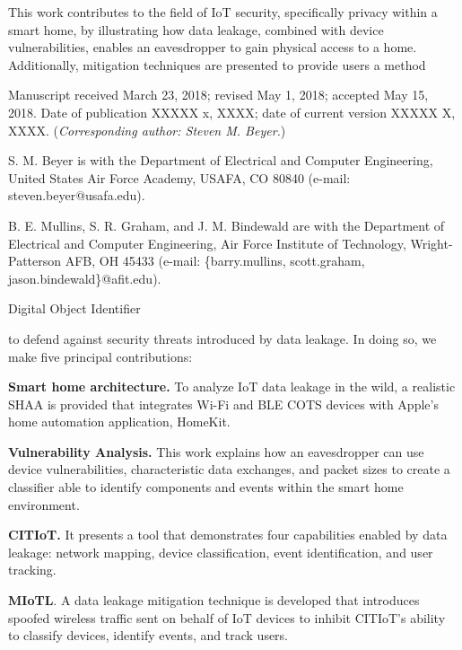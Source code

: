 \documentclass[journal]{./IEEEtran/IEEEtran}
\begin{document}
This work contributes to the field of \ac{IoT} security, specifically privacy within a smart home, by illustrating how data leakage, combined with device vulnerabilities, enables an eavesdropper to gain physical access to a home. Additionally, mitigation techniques are presented to provide users a method 

\vspace*{-3\baselineskip}

\begin{IEEEbiographynophoto}{}
	Manuscript received March 23, 2018; revised May 1, 2018; accepted May 15, 2018. Date of publication XXXXX x, XXXX; date of current version XXXXX X, XXXX. (\textit{Corresponding author: Steven M. Beyer.})
	
	S. M. Beyer is with the Department of Electrical and Computer Engineering, United States Air Force Academy, USAFA, CO 80840 (e-mail: steven.beyer@usafa.edu).
	
	B. E. Mullins, S. R. Graham, and J. M. Bindewald are with the Department of Electrical and Computer Engineering, Air Force Institute of Technology, Wright-Patterson AFB, OH 45433 (e-mail: \{barry.mullins, scott.graham, jason.bindewald\}@afit.edu).
	
	Digital Object Identifier 
\end{IEEEbiographynophoto}

to defend against security threats introduced by data leakage. In doing so, we make five principal contributions:

\textbf{Smart home architecture.} To analyze \ac{IoT} data leakage in the wild, a realistic \ac{SHAA} is provided that integrates Wi-Fi and \ac{BLE} \ac{COTS} devices with Apple's home automation application, HomeKit.

\textbf{Vulnerability Analysis.} This work explains how an eavesdropper can use device vulnerabilities, characteristic data exchanges, and packet sizes to create a classifier able to identify components and events within the smart home environment.

\textbf{\acf{CITIoT}.} It presents a tool that demonstrates four capabilities enabled by data leakage: network mapping, device classification, event identification, and user tracking.

\textbf{\acf{MIoTL}}. A data leakage mitigation technique is developed that introduces spoofed wireless traffic sent on behalf of \ac{IoT} devices to inhibit \ac{CITIoT}'s ability to classify devices, identify events, and track users. 
\end{document}
